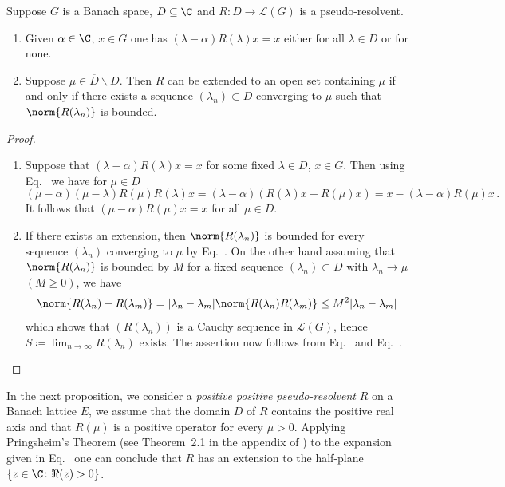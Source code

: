 \begin{proposition}\label{prop:c3-2.6}
	Suppose $G$ is a Banach space, $D \subseteq \C $ and $R \colon D \to \mathcal{L}(G)$ is a pseudo-resolvent.
	
	\begin{enumerate}[\upshape (i)]
		\item Given $\alpha \in \C $, $x \in G$ one has $(\lambda-\alpha)R(\lambda)x = x$ either for all $\lambda \in D$ or for none.
		
		\item Suppose $\mu \in \overline{D}\backslash D$. Then $R$ can be extended to an open set containing $\mu$ if and only if there exists a sequence $(\lambda_{n}) \subset D$ converging to $\mu$ such that $\norm{R(\lambda_{n})}$ is bounded.
	\end{enumerate}
\end{proposition}
\begin{proof}
	\begin{enumerate}[\upshape (i), wide, labelindent=.25em]
		\item 
        Suppose that $(\lambda-\alpha)R(\lambda)x = x$ for some fixed $\lambda \in D$, $x \in G$.
		Then using Eq.~ we have for $\mu \in D$ 
        \[
        (\mu-\alpha)(\mu-\lambda)R(\mu)R(\lambda)x = (\lambda-\alpha)(R(\lambda)x - R(\mu)x) = x - (\lambda-\alpha)R(\mu)x\,.
        \]
		It follows that $(\mu-\alpha)R(\mu)x = x$ for all $\mu \in D$.
		
		\item 
        If there exists an extension, then $\norm{R(\lambda_{n})}$ is bounded for every sequence $(\lambda_{n})$ converging to $\mu$ by Eq.~.
		On the other hand assuming that $\norm{R(\lambda_{n})}$ is bounded by $M$ for a fixed sequence $(\lambda_{n}) \subset D$ with $\lambda_{n} \to \mu$ $(M \geq 0)$, we have
		\[
		\norm{R(\lambda_{n}) - R(\lambda_{m})} = |\lambda_{n}-\lambda_{m}| \norm{R(\lambda_{n})R(\lambda_{m})} \leq M^2|\lambda_{n}-\lambda_{m}|
        \]
        which shows that $(R(\lambda_{n}))$ is a Cauchy sequence in $\mathcal{L}(G)$, hence $S \coloneq \lim_{n\to\infty}R(\lambda_{n})$ exists.
		The assertion now follows from Eq.~ and Eq.~.
	\end{enumerate}
\end{proof}
In the next proposition, we consider a \emph{positive positive pseudo-resolvent}
$R$ on a Banach lattice $E$, \ie  we assume that the domain $D$ of\/ $R$ contains the positive real axis and that $R(\mu)$ is a positive operator for every $\mu > 0$.
Applying Pringsheim's Theorem (see Theorem~2.1 in the appendix of \textcite{schaefer:1966}) to the expansion given in Eq.~ one can conclude that $R$ has an extension to the half-plane $\{z \in \C  \colon \Re(z) > 0\}$.


